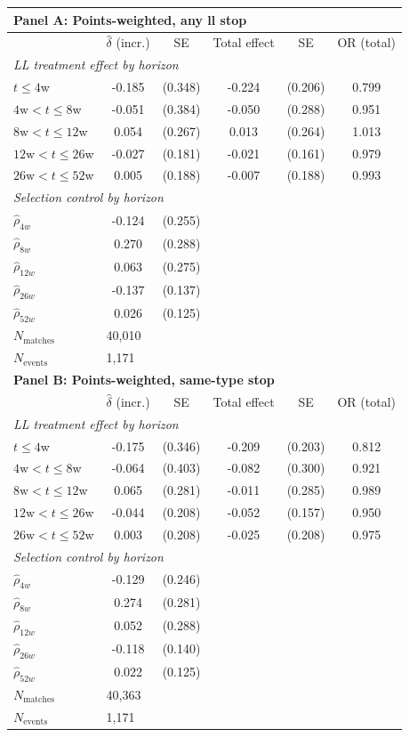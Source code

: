 \begin{tabular}{lccccc}
\toprule
\multicolumn{6}{l}{\textbf{Panel A: Points-weighted, any ll stop}} \\
\midrule
 & $\hat{\delta}$ (incr.) & SE & Total effect & SE & OR (total) \\
\midrule
\multicolumn{6}{l}{\textit{LL treatment effect by horizon}} \\
$t \leq 4$w & -0.185 & (0.348) & -0.224 & (0.206) & 0.799 \\
$4\text{w} < t \leq 8$w & -0.051 & (0.384) & -0.050 & (0.288) & 0.951 \\
$8\text{w} < t \leq 12$w & 0.054 & (0.267) & 0.013 & (0.264) & 1.013 \\
$12\text{w} < t \leq 26$w & -0.027 & (0.181) & -0.021 & (0.161) & 0.979 \\
$26\text{w} < t \leq 52$w & 0.005 & (0.188) & -0.007 & (0.188) & 0.993 \\
[4pt]
\multicolumn{6}{l}{\textit{Selection control by horizon}} \\
$\hat{\rho}_{4w}$ & -0.124 & (0.255) & & & \\
$\hat{\rho}_{8w}$ & 0.270 & (0.288) & & & \\
$\hat{\rho}_{12w}$ & 0.063 & (0.275) & & & \\
$\hat{\rho}_{26w}$ & -0.137 & (0.137) & & & \\
$\hat{\rho}_{52w}$ & 0.026 & (0.125) & & & \\
[4pt]
$N_{\text{matches}}$ & \multicolumn{5}{l}{40,010} \\
$N_{\text{events}}$ & \multicolumn{5}{l}{1,171} \\
\midrule
\multicolumn{6}{l}{\textbf{Panel B: Points-weighted, same-type stop}} \\
\midrule
 & $\hat{\delta}$ (incr.) & SE & Total effect & SE & OR (total) \\
\midrule
\multicolumn{6}{l}{\textit{LL treatment effect by horizon}} \\
$t \leq 4$w & -0.175 & (0.346) & -0.209 & (0.203) & 0.812 \\
$4\text{w} < t \leq 8$w & -0.064 & (0.403) & -0.082 & (0.300) & 0.921 \\
$8\text{w} < t \leq 12$w & 0.065 & (0.281) & -0.011 & (0.285) & 0.989 \\
$12\text{w} < t \leq 26$w & -0.044 & (0.208) & -0.052 & (0.157) & 0.950 \\
$26\text{w} < t \leq 52$w & 0.003 & (0.208) & -0.025 & (0.208) & 0.975 \\
[4pt]
\multicolumn{6}{l}{\textit{Selection control by horizon}} \\
$\hat{\rho}_{4w}$ & -0.129 & (0.246) & & & \\
$\hat{\rho}_{8w}$ & 0.274 & (0.281) & & & \\
$\hat{\rho}_{12w}$ & 0.052 & (0.288) & & & \\
$\hat{\rho}_{26w}$ & -0.118 & (0.140) & & & \\
$\hat{\rho}_{52w}$ & 0.022 & (0.125) & & & \\
[4pt]
$N_{\text{matches}}$ & \multicolumn{5}{l}{40,363} \\
$N_{\text{events}}$ & \multicolumn{5}{l}{1,171} \\
\bottomrule
\end{tabular}
